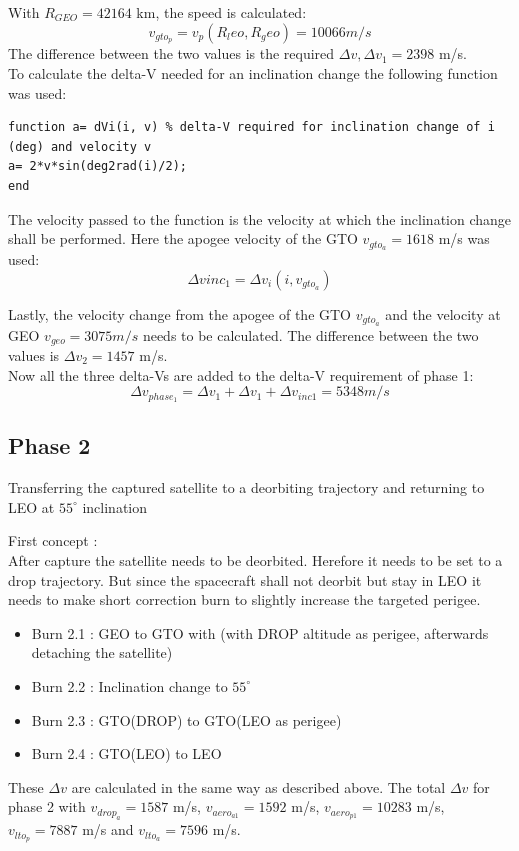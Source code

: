 With $R_{GEO} = 42164$ km, the speed is calculated:
\begin{equation}
	v_{gto_p} = v_p(R_leo, R_geo) = 10066 m/s
\end{equation}
The difference between the two values is the required $\Delta v, \Delta v_1 = 2398$ m/s.\\

To calculate the delta-V needed for an inclination change the following function was used:
\begin{verbatim}
function a= dVi(i, v) % delta-V required for inclination change of i (deg) and velocity v
a= 2*v*sin(deg2rad(i)/2);
end
\end{verbatim}

The velocity passed to the function is the velocity at which the inclination change shall be performed.
Here the apogee velocity of the GTO $v_{gto_a} = 1618$ m/s was used:
\begin{equation}
	\Delta v{inc_1} = \Delta v_i(i, v_{gto_a})
\end{equation}

Lastly, the velocity change from the apogee of the GTO $v_{gto_a}$ and the velocity at GEO $v_{geo} = 3075 m/s$ needs to be calculated. The difference between the two values is $\Delta v_2 = 1457$ m/s.\\

Now all the three delta-Vs are added to the delta-V requirement of phase 1:
\begin{equation}
	\Delta v_{phase_1} = \Delta v_1+\Delta v_1+\Delta v_{inc1} = 5348 m/s
\end{equation}


\subsection{Phase 2 }
\begin{center}
	Transferring the captured satellite to a deorbiting trajectory and returning to LEO at $55^\circ$ inclination
\end{center}
First concept : \\


After capture the satellite needs to be deorbited. Herefore it needs to be set to a drop trajectory. But
since the spacecraft shall not deorbit but stay in LEO it needs to make short correction burn to slightly increase the targeted perigee.
\begin{itemize}
	\item Burn 2.1 : GEO to GTO with (with DROP altitude as perigee, afterwards detaching the satellite)
	\item Burn 2.2 : Inclination change to $55^\circ$
	\item Burn 2.3 : GTO(DROP) to GTO(LEO as perigee)
	\item Burn 2.4 : GTO(LEO) to LEO
\end{itemize}
These $\Delta v$ are calculated in the same way as described above. The total $\Delta v$ for phase 2 with $v_{drop_a} = 1587$ m/s, $v_{aero_{a1}} = 1592$ m/s, $v_{aero_{p1}} = 10283$ m/s, $v_{lto_p}
= 7887$ m/s and $v_{lto_a} = 7596$ m/s.

